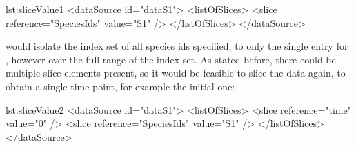 \begin{myXmlLst}{}{lst:sliceValue1}
<dataSource id="dataS1">
	<listOfSlices>
		<slice reference="SpeciesIds" value="S1" />
	</listOfSlices>
</dataSource>
\end{myXmlLst} 

would isolate the index set of all species ids specified, to only the single entry for , however over the full range of the  index set. As stated before, there could be multiple slice elements present, so it would be feasible to slice the data again, to obtain a single time point, for example the initial one:

\begin{myXmlLst}{}{lst:sliceValue2}
<dataSource id="dataS1">
	<listOfSlices>
		<slice reference="time" value="0" />
		<slice reference="SpeciesIds" value="S1" />
	</listOfSlices>
</dataSource>
\end{myXmlLst} 
